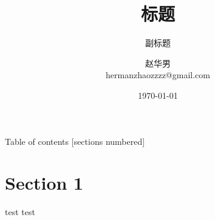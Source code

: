 \documentclass{beamer}
\title{标题}
\subtitle{副标题}
\date{\today}
\author{赵华男\\hermanzhaozzzz@gmail.com}
\institute{School of Life Science, Tsinghua University, Beijing}
\begin{document}
\maketitle

\begin{frame}{Table of contents}
  [sections numbered]
  \tableofcontents[hideallsubsections]
\end{frame}









\section{Section 1}

\begin{frame}[fragile]{test}
    test    
\end{frame}
\end{document}
